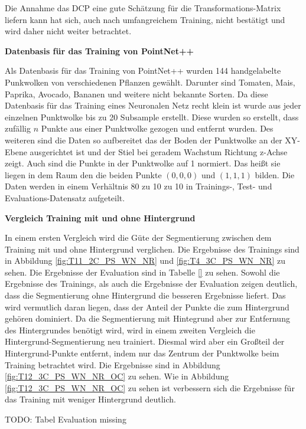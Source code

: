 \documentclass[12pt,titlepage, twoside]{article}
\begin{document}
Die Annahme das DCP eine gute Schätzung für die Transformations-Matrix liefern kann hat sich, auch nach umfangreichem Training, nicht bestätigt und wird daher nicht weiter betrachtet.

\textbf{Datenbasis für das Training von PointNet++}

Als Datenbasis für das Training von PointNet++ wurden 144 handgelabelte Punkwolken von verschiedenen Pflanzen gewählt. Darunter sind Tomaten, Mais, Paprika, Avocado, Bananen und weitere nicht bekannte Sorten. 
Da diese Datenbasis für das Training eines Neuronalen Netz recht klein ist wurde aus jeder einzelnen Punktwolke bis zu 20 Subsample erstellt. Diese wurden so erstellt, dass zufällig $n$ Punkte aus einer Punktwolke gezogen und entfernt wurden.
Des weiteren sind die Daten so aufbereitet das der Boden der Punktwolke an der XY-Ebene ausgerichtet ist und der Stiel bei geradem Wachstum Richtung z-Achse zeigt. Auch sind die Punkte in der Punktwolke auf 1 normiert. 
Das heißt sie liegen in dem Raum den die beiden Punkte $(0,0,0)$ und $(1,1,1)$ bilden. Die Daten werden in einem Verhältnis 80 zu 10 zu 10 in Trainings-, Test- und Evaluations-Datensatz aufgeteilt.

\textbf{Vergleich Training mit und ohne Hintergrund}

In einem ersten Vergleich wird die Güte der Segmentierung zwischen dem Training mit und ohne Hintergrund verglichen. Die Ergebnisse des Trainings sind in Abbildung \ref{fig:T11_2C_PS_WN_NR} und \ref{fig:T4_3C_PS_WN_NR} zu sehen.
Die Ergebnisse der Evaluation sind in Tabelle \ref{} zu sehen. 
Sowohl die Ergebnisse des Trainings, als auch die Ergebnisse der Evaluation zeigen deutlich, dass die Segmentierung ohne Hintergrund die besseren Ergebnisse liefert.
Das wird vermutlich daran liegen, dass der Anteil der Punkte die zum Hintergrund gehören dominiert.
Da die Segmentierung mit Hintegrund aber zur Entfernung des Hintergrundes benötigt wird, wird in einem zweiten Vergleich die Hintergrund-Segmentierung neu trainiert. 
Diesmal wird aber ein Großteil der Hintergrund-Punkte entfernt, indem nur das Zentrum der Punktwolke beim Training betrachtet wird. Die Ergebnisse sind in Abbildung \ref{fig:T12_3C_PS_WN_NR_OC} zu sehen.
Wie in Abbildung \ref{fig:T12_3C_PS_WN_NR_OC} zu sehen ist verbessern sich die Ergebnisse für das Training mit weniger Hintergrund deutlich. 

TODO: Tabel Evaluation missing
\end{document}

